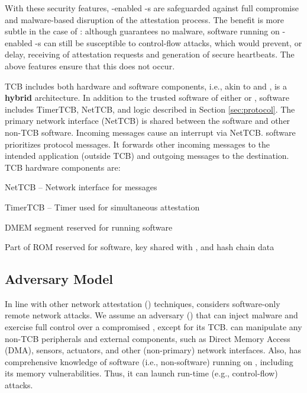 With these security features, \rata-enabled \prv-s are safeguarded against
full compromise and malware-based disruption of the attestation process.
The benefit is more subtle in the case of \casu: although \casu guarantees no malware,
software running on \casu-enabled \prv-s can still be susceptible to control-flow attacks, 
which would prevent, or delay, receiving of \vrf attestation requests and 
generation of secure heartbeats. The above features ensure that this does not occur.

\system TCB includes both hardware and software components, i.e., akin to \rata and \casu, 
\system is a {\bf hybrid} architecture. In addition to the trusted software of either \rata or \casu, 
\system software includes TimerTCB, NetTCB, and \sa logic described in Section \ref{sec:protocol}.
The primary network interface (NetTCB) is shared between the \system software  
and other non-TCB software. Incoming messages cause an interrupt via NetTCB.
\system software prioritizes \system protocol messages. It forwards other incoming messages to the intended
application (outside TCB) and outgoing messages to the destination.
TCB hardware components are:
%
\begin{compactitem}
    \item NetTCB -- Network interface for \system messages
    \item TimerTCB -- Timer used for simultaneous attestation
    \item DMEM segment reserved for running \system software 
    \item Part of ROM reserved for \system software, key shared with \vrf, and hash chain data
\end{compactitem}
\subsection{Adversary Model \label{sec: adversary}}
%
In line with other network attestation (\sa) techniques, \system considers software-only 
remote network attacks. We assume an adversary (\sadv) that can inject malware and exercise 
full control over a compromised \prv, except for its TCB. \sadv can manipulate any non-TCB
peripherals and external components, such as Direct Memory Access (DMA), sensors, actuators, 
and other (non-primary) network interfaces. Also, \sadv has comprehensive knowledge 
of software (i.e., non-\system software) running on \prv,
including its memory vulnerabilities. Thus, it can launch run-time (e.g., control-flow) attacks.


